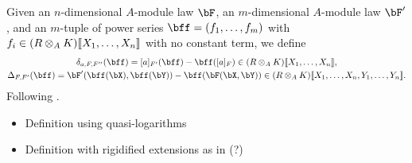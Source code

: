Given an $n$-dimensional $A$-module law $\bF$, an $m$-dimensional $A$-module law 
$\bF'$, and an $m$-tuple of power series $\bff = (f_1, \dots, f_m)$ with $f_i \in
(R \otimes_A K)\llbracket X_1, \dots, X_n \rrbracket$ with no constant term, we define
\begin{gather*}
  \delta_{a,F,F''}(\bff) = [a]_{F'}(\bff) - \bff([a]_F) \in (R \otimes_A K)\llbr
  X_1, \dots, X_n \rrbr, \\
  \Delta_{F,F'}(\bff) = \bF'(\bff(\bX), \bff(\bY)) - \bff(\bF(\bX,\bY)) \in 
  (R \otimes_A K) \llbr X_1, \dots, X_n, Y_1, \dots, Y_n\rrbr.
\end{gather*}
Following \cite{hopkins1994equivariant}.

\begin{itemize}
  \item Definition using quasi-logarithms
  \item Definition with rigidified extensions as in \cite{hopkins1994equivariant} (?)
\end{itemize}

